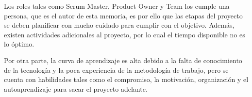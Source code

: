 Los roles tales como Scrum Master, Product Owner y Team los cumple una persona, que es el autor de esta memoria, es por ello que las etapas del proyecto se deben planificar con mucho cuidado para cumplir con el objetivo. Además, existen actividades adicionales al proyecto, por lo cual el tiempo disponible no es lo óptimo.

Por otra parte, la curva de aprendizaje es alta debido a la falta de conocimiento de la tecnología y la poca experiencia de la metodología de trabajo, pero se cuenta con habilidades tales como el compromiso, la motivación, organización y el autoaprendizaje para sacar el proyecto adelante.

